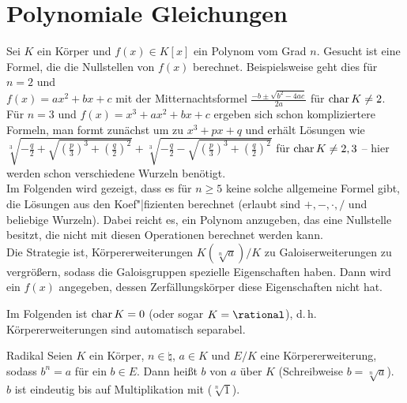 \pagebreak

\section{%
    Polynomiale Gleichungen%
}

\begin{Bem}
    Sei $K$ ein Körper und $f(x) \in K[x]$ ein Polynom vom Grad $n$.
    Gesucht ist eine Formel, die die Nullstellen von $f(x)$ berechnet.
    Beispielsweise geht dies für $n = 2$ und\\
    $f(x) = ax^2 + bx + c$
    mit der Mitternachtsformel $\frac{-b \pm \sqrt{b^2 - 4ac}}{2a}$
    für $\operatorname{char} K \not= 2$.
    Für $n = 3$ und $f(x) = x^3 + ax^2 + bx + c$ ergeben sich schon
    kompliziertere Formeln, man formt zunächst um zu $x^3 + px + q$ und
    erhält Lösungen wie
    $\sqrt[3]{-\frac{q}{2} + \sqrt{\left(\frac{p}{3}\right)^3 +
    \left(\frac{q}{2}\right)^2}} +
    \sqrt[3]{-\frac{q}{2} - \sqrt{\left(\frac{p}{3}\right)^3 +
    \left(\frac{q}{2}\right)^2}}$
    für $\operatorname{char} K \not= 2, 3$ -- hier werden schon verschiedene Wurzeln
    benötigt.\\
    Im Folgenden wird gezeigt, dass es für $n \ge 5$ keine solche allgemeine
    Formel gibt, die Lösungen aus den Koef"|fizienten berechnet
    (erlaubt sind $+, -, \cdot, /$ und beliebige Wurzeln).
    Dabei reicht es, ein Polynom anzugeben, das eine Nullstelle besitzt,
    die nicht mit diesen Operationen berechnet werden kann.\\
    Die Strategie ist, Körpererweiterungen $K(\sqrt[n]{a})/K$ zu
    Galoiserweiterungen zu vergrößern,
    sodass die Galoisgruppen spezielle Eigenschaften haben.
    Dann wird ein $f(x)$ angegeben, dessen Zerfällungskörper diese
    Eigenschaften nicht hat.
\end{Bem}

\linie

\begin{Bem}
    Im Folgenden ist $\operatorname{char} K = 0$ (oder sogar $K = \rational$),
    d.\,h. Körpererweiterungen sind automatisch separabel.
\end{Bem}

\begin{Def}{Radikal}
    Seien $K$ ein Körper, $n \in \natural$, $a \in K$ und
    $E/K$ eine Körpererweiterung, sodass $b^n = a$ für ein $b \in E$.
    Dann heißt $b$  von $a$ über $K$
    (Schreibweise $b = \sqrt[n]{a}$).\\
    $b$ ist eindeutig bis auf Multiplikation mit 
    ($\sqrt[n]{1}$).
\end{Def}

